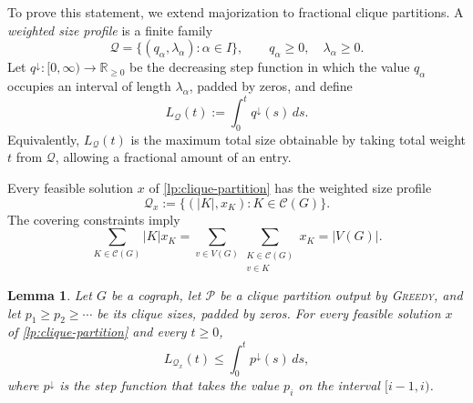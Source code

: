 \documentclass[a4paper,fleqn]{cas-sc}
\newtheorem{lem}[thm]{Lemma}
\theoremstyle{remark}
\theoremstyle{plain}
\newcommand{\defn}[1]{\emph{#1}}
\newcommand{\greedy}{{\textsc{Greedy}}}
\begin{document}
To prove this statement, we extend majorization to fractional clique
partitions. A \defn{weighted size profile} is a finite family
\[
\mathcal{Q}=\{(q_\alpha,\lambda_\alpha):\alpha\in I\},
\qquad q_\alpha\geq 0,\quad \lambda_\alpha\geq 0.
\]
Let $q^\downarrow:[0,\infty)\to\mathbb{R}_{\geq0}$ be the decreasing
step function in which the value $q_\alpha$ occupies an interval of
length $\lambda_\alpha$, padded by zeros, and define
\[
L_{\mathcal{Q}}(t):=\int_0^t q^\downarrow(s)\,ds.
\]
Equivalently, $L_{\mathcal{Q}}(t)$ is the maximum total size obtainable
by taking total weight $t$ from $\mathcal{Q}$, allowing a fractional
amount of an entry.

Every feasible solution $x$ of \eqref{lp:clique-partition} has the
weighted size profile
\[
\mathcal{Q}_x
   :=\{(|K|,x_K):K\in\mathcal{C}(G)\}.
\]
The covering constraints imply
\begin{equation} \label{eq:fractional-profile-sum}
\sum_{K\in\mathcal{C}(G)}|K|x_K
=\sum_{v\in V(G)}
  \sum_{\substack{K\in\mathcal{C}(G)\\v\in K}}x_K
=|V(G)|.
\end{equation}

\begin{lem} \label{lem:fractional-majorization}
Let $G$ be a cograph, let $\mathcal{P}$ be a clique partition output
by \greedy{}, and let $p_1\geq p_2\geq\cdots$ be its clique sizes,
padded by zeros. For every feasible solution $x$ of
\eqref{lp:clique-partition} and every $t\geq0$,
\[
L_{\mathcal{Q}_x}(t)
\leq \int_0^t p^\downarrow(s)\,ds,
\]
where $p^\downarrow$ is the step function that takes the value $p_i$
on the interval $[i-1,i)$.
\end{lem}
\end{document}
